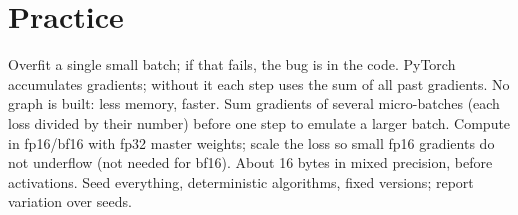 \section{Practice}
\begin{rapid}
	 Overfit a single small batch; if that fails, the bug is in the code.
	 PyTorch accumulates gradients; without it each step uses the sum of all past gradients.
	 No graph is built: less memory, faster.
	 Sum gradients of several micro-batches (each loss divided by their number) before one step to emulate a
	larger batch.
	 Compute in fp16/bf16 with fp32 master weights; scale the loss so small fp16 gradients do not
	underflow (not needed for bf16).
	 About 16 bytes in mixed precision, before activations.
	 Seed everything, deterministic algorithms, fixed versions; report variation over seeds.
\end{rapid}
